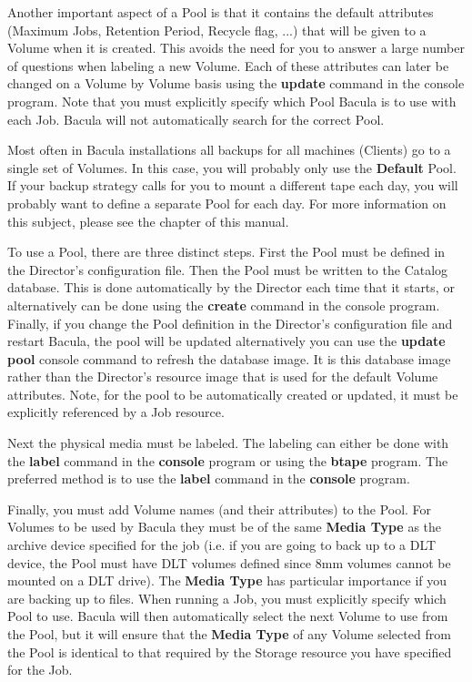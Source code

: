Another important aspect of a Pool is that it contains the default attributes
(Maximum Jobs, Retention Period, Recycle flag, ...) that will be given to a
Volume when it is created. This avoids the need for you to answer a large
number of questions when labeling a new Volume. Each of these attributes can
later be changed on a Volume by Volume basis using the {\bf update} command in
the console program. Note that you must explicitly specify which Pool Bacula
is to use with each Job. Bacula will not automatically search for the correct
Pool. 

Most often in Bacula installations all backups for all machines (Clients) go
to a single set of Volumes. In this case, you will probably only use the {\bf
Default} Pool. If your backup strategy calls for you to mount a different tape
each day, you will probably want to define a separate Pool for each day. For
more information on this subject, please see the 
 chapter of this
manual. 


To use a Pool, there are three distinct steps. First the Pool must be defined
in the Director's configuration file. Then the Pool must be written to the
Catalog database. This is done automatically by the Director each time that it
starts, or alternatively can be done using the {\bf create} command in the
console program. Finally, if you change the Pool definition in the Director's
configuration file and restart Bacula, the pool will be updated alternatively
you can use the {\bf update pool} console command to refresh the database
image. It is this database image rather than the Director's resource image
that is used for the default Volume attributes. Note, for the pool to be
automatically created or updated, it must be explicitly referenced by a Job
resource. 

Next the physical media must be labeled. The labeling can either be done with
the {\bf label} command in the {\bf console} program or using the {\bf btape}
program. The preferred method is to use the {\bf label} command in the {\bf
console} program. 

Finally, you must add Volume names (and their attributes) to the Pool. For
Volumes to be used by Bacula they must be of the same {\bf Media Type} as the
archive device specified for the job (i.e. if you are going to back up to a
DLT device, the Pool must have DLT volumes defined since 8mm volumes cannot be
mounted on a DLT drive). The {\bf Media Type} has particular importance if you
are backing up to files. When running a Job, you must explicitly specify which
Pool to use. Bacula will then automatically select the next Volume to use from
the Pool, but it will ensure that the {\bf Media Type} of any Volume selected
from the Pool is identical to that required by the Storage resource you have
specified for the Job. 


